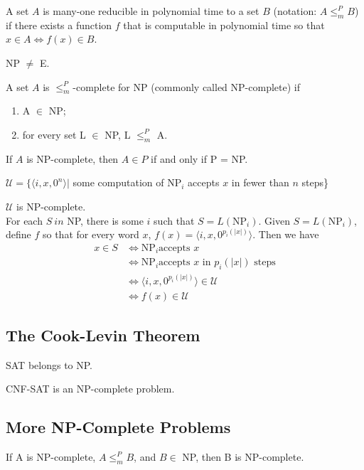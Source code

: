  A set $A$ is many-one reducible in polynomial time to a
set $B$
(notation: $A \le^P_m B$) if there exists a function $f$ that is computable
in polynomial time so that $x \in A \Leftrightarrow f(x) \in B$.

 NP $\ne$ E.

 A set $A$ is $\le^P_m$-complete for NP (commonly
called NP-complete) if
\begin{enumerate}
  \item A $\in$ NP;
  \item for every set L $\in$ NP, L $\le^P_m$ A.
\end{enumerate}

 If $A$ is NP-complete, then $A \in P$ if and only if P =
NP.

 $\mathscr{U} = \{\langle i, x, 0^n \rangle |$ some
computation of NP$_i$ accepts $x$ in fewer than $n$ steps\}

 $\mathscr{U}$ is NP-complete.\\
For each $S\ in$ NP, there is some $i$ such
that $S = L(\text{NP}_i)$. Given $S = L(\text{NP}_i)$, define $f$ so that for
every word $x$, $f(x) = \langle i, x, 0^{p_i(|x|)} \rangle$. Then we have
\begin{align*}
  x \in S &\Leftrightarrow \text{NP}_i \text{accepts } x \\
  &\Leftrightarrow \text{NP}_i \text{accepts } x \text{ in } p_i(|x|) \text{ steps}\\
  &\Leftrightarrow \langle i, x, 0^{p_i(|x|)} \rangle \in \mathscr{U}\\
  &\Leftrightarrow f(x) \in \mathscr{U}
\end{align*}

\subsection{The Cook-Levin Theorem}

 SAT belongs to NP.

 CNF-SAT is an NP-complete problem.

\subsection{More NP-Complete Problems}

 If A is NP-complete, $A \le_m^P B$, and $B \in$ NP, then B is NP-complete.

